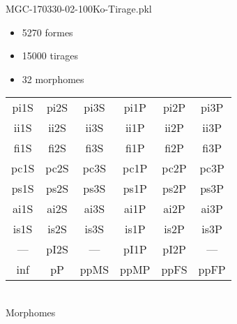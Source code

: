 MGC-170330-02-100Ko-Tirage.pkl
\begin{itemize}
\item 5270 formes
\item 15000 tirages
\item 32 morphomes
\end{itemize}
\begin{center}
\begin{tabular}{cccccc}
\hline
\cellcolor{white}pi1S & \cellcolor{white}pi2S & \cellcolor{white}pi3S & \cellcolor{white}pi1P & \cellcolor{white}pi2P & \cellcolor{white}pi3P\\
\cellcolor{brown}ii1S & \cellcolor{brown}ii2S & \cellcolor{brown}ii3S & \cellcolor{white}ii1P & \cellcolor{white}ii2P & \cellcolor{brown}ii3P\\
\cellcolor{yellow}fi1S & \cellcolor{lime}fi2S & \cellcolor{lime}fi3S & \cellcolor{green}fi1P & \cellcolor{white}fi2P & \cellcolor{green}fi3P\\
\cellcolor{yellow}pc1S & \cellcolor{yellow}pc2S & \cellcolor{yellow}pc3S & \cellcolor{white}pc1P & \cellcolor{white}pc2P & \cellcolor{yellow}pc3P\\
\cellcolor{teal}ps1S & \cellcolor{white}ps2S & \cellcolor{teal}ps3S & \cellcolor{white}ps1P & \cellcolor{white}ps2P & \cellcolor{teal}ps3P\\
\cellcolor{white}ai1S & \cellcolor{lightgray}ai2S & \cellcolor{lightgray}ai3S & \cellcolor{white}ai1P & \cellcolor{black}ai2P & \cellcolor{white}ai3P\\
\cellcolor{black}is1S & \cellcolor{black}is2S & \cellcolor{lightgray}is3S & \cellcolor{black}is1P & \cellcolor{black}is2P & \cellcolor{white}is3P\\
--- & \cellcolor{white}pI2S & --- & \cellcolor{white}pI1P & \cellcolor{white}pI2P & ---\\
\cellcolor{white}inf & \cellcolor{white}pP & \cellcolor{white}ppMS & \cellcolor{white}ppMP & \cellcolor{magenta}ppFS & \cellcolor{magenta}ppFP\\
\hline
\end{tabular}\\
Morphomes
\end{center}
\bigskip

